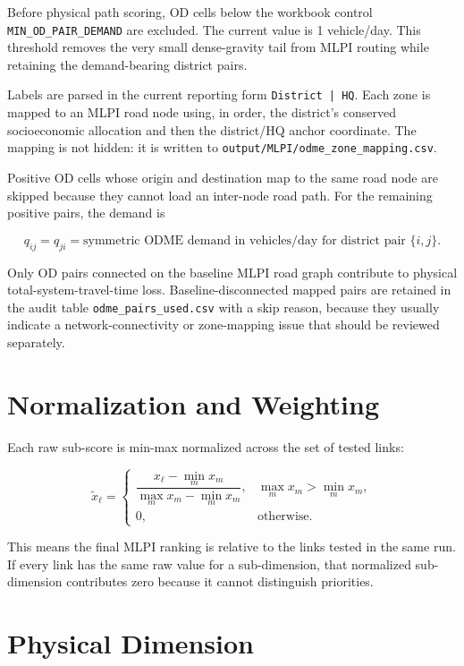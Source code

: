 \documentclass[11pt,a4paper]{article}
\begin{document}
Before physical path scoring, OD cells below the workbook control
\texttt{MIN\_OD\_PAIR\_DEMAND} are excluded. The current value is
1 vehicle/day. This threshold removes the very small dense-gravity tail from
MLPI routing while retaining the demand-bearing district pairs.

Labels are parsed in the current reporting form
\texttt{District | HQ}. Each zone is mapped to an MLPI road node using, in
order, the district's conserved socioeconomic allocation and then the
district/HQ anchor coordinate. The mapping is not hidden: it is written to
\texttt{output/MLPI/odme\_zone\_mapping.csv}.

Positive OD cells whose origin and destination map to the same road node are
skipped because they cannot load an inter-node road path. For the remaining
positive pairs, the demand is

\begin{equation}
q_{ij}=q_{ji}
= \text{symmetric ODME demand in vehicles/day for district pair }\{i,j\}.
\end{equation}

Only OD pairs connected on the baseline MLPI road graph contribute to physical
total-system-travel-time loss. Baseline-disconnected mapped pairs are retained
in the audit table \texttt{odme\_pairs\_used.csv} with a skip reason, because
they usually indicate a network-connectivity or zone-mapping issue that should
be reviewed separately.

\section{Normalization and Weighting}

Each raw sub-score is min-max normalized across the set of tested links:

\begin{equation}
\widetilde{x}_{\ell} =
\begin{cases}
\dfrac{x_{\ell}-\min_m x_m}{\max_m x_m-\min_m x_m},
& \max_m x_m > \min_m x_m,\\[8pt]
0, & \text{otherwise}.
\end{cases}
\label{eq:mlpi-minmax}
\end{equation}

This means the final MLPI ranking is relative to the links tested in the same
run. If every link has the same raw value for a sub-dimension, that normalized
sub-dimension contributes zero because it cannot distinguish priorities.

\section{Physical Dimension}
\end{document}
